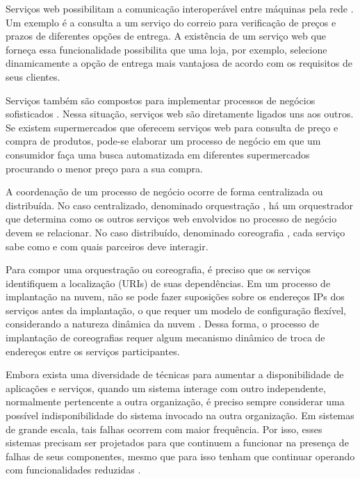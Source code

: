 Serviços web possibilitam a comunicação interoperável entre máquinas pela rede \cite{W3C-WS}. Um exemplo é a consulta a um serviço do correio para verificação de preços e prazos de diferentes opções de entrega. A existência de um serviço web que forneça essa funcionalidade possibilita que uma loja, por exemplo, selecione dinamicamente a opção de entrega mais vantajosa de acordo com os requisitos de seus clientes. 

Serviços também são compostos para implementar processos de negócios sofisticados \cite{Papazoglou2007State}. Nessa situação, serviços web são diretamente ligados uns aos outros. Se existem supermercados que oferecem serviços web para consulta de preço e compra de produtos, pode-se elaborar um processo de negócio em que um consumidor faça uma busca automatizada em diferentes supermercados procurando o menor preço para a sua compra. 

A coordenação de um processo de negócio ocorre de forma centralizada ou distribuída. No caso centralizado, denominado orquestração \cite{Nanda2004Decentralizing}, há um orquestrador que determina como os outros serviços web envolvidos no processo de negócio devem se relacionar. No caso distribuído, denominado coreografia \cite{Barker2009Choreographing}, cada serviço sabe como e com quais parceiros deve interagir. 

Para compor uma orquestração ou coreografia, é preciso que os serviços identifiquem a localização (URIs) de suas dependências. Em um processo de implantação na nuvem, não se pode fazer suposições sobre os endereços IPs dos serviços antes da implantação, o que requer um modelo de configuração flexível, considerando a natureza dinâmica da nuvem \cite{Amazon2012Practices}. Dessa forma, o processo de implantação de coreografias requer algum mecanismo dinâmico de troca de endereços entre os serviços participantes. 

Embora exista uma diversidade de técnicas para aumentar a disponibilidade de aplicações e serviços, quando um sistema interage com outro independente, normalmente pertencente a outra organização, é preciso sempre considerar uma possível indisponibilidade do sistema invocado na outra organização. Em sistemas de grande escala, tais falhas ocorrem com maior frequência. Por isso, esses sistemas precisam ser projetados para que continuem a funcionar na presença de falhas de seus componentes, mesmo que para isso tenham que continuar operando com funcionalidades reduzidas \cite{Hamilton2007InternetScale,  Helland2009Quicksand}.

